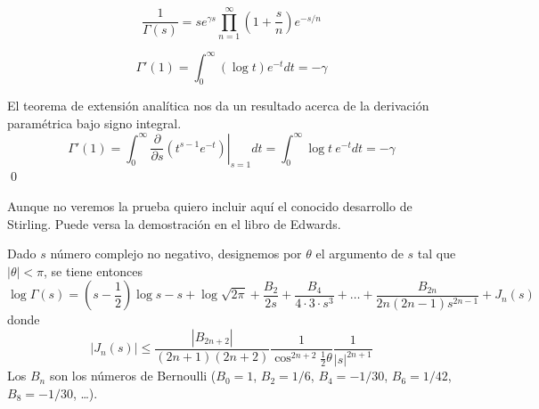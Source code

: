 \documentclass[TAN.tex]{subfiles}
\begin{document}
\begin{prop}
\[ \frac{1}{Γ(s)} = s e^{γs} \prod_{n=1}^{∞} \left(1 + \frac{s}{n}\right) e^{-s/n} \]
\end{prop}
\begin{prop}
\[ Γ'(1) = \int_0^{∞} (\log t) e^{-t} dt = -γ \]
\end{prop}
\begin{dem}
El teorema de extensión analítica nos da un resultado acerca de la derivación paramétrica bajo signo integral.
\[ Γ'(1) = \int_0^{∞} \left.\frac{\partial}{\partial s} (t^{s-1}e^{-t})\right|_{s=1} dt = \int_0^{∞}\log t\ e^{-t} dt = -γ \]
\qed
\end{dem}
Aunque no veremos la prueba quiero incluir aquí el conocido desarrollo de Stirling. Puede versa la demostración en el libro de Edwards.
\begin{prop}
Dado $s$ número complejo no negativo, designemos por $θ$ el argumento de $s$ tal que $|θ| < π$, se tiene entonces
\[ \log Γ(s) = \left(s - \frac{1}{2}\right) \log s - s + \log \sqrt{2π} + \frac{B_2}{2s} + \frac{B_4}{4\cdot 3 \cdot s^3} + \dots + \frac{B_{2n}}{2n(2n-1)s^{2n-1}} + J_n(s) \]
donde
\[ |J_n(s)| ≤ \frac{|B_{2n+2}|}{(2n+1)(2n+2)} \frac{1}{\cos^{2n+2}\frac{1}{2}θ} \frac{1}{|s|^{2n+1}} \]
Los $B_n$ son los números de Bernoulli ($B_0=1$, $B_2 = 1/6$, $B_4=-1/30$, $B_6 = 1/42$, $B_8 = -1/30$, \dots).
\end{prop}
\end{document}
